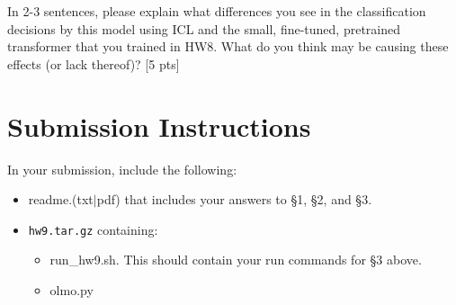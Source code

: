\documentclass[11pt]{article}
\begin{document}
\vspace{2em}
 In 2-3 sentences, please explain what differences you see in the classification decisions by this model using ICL and the small, fine-tuned, pretrained transformer that you trained in HW8. What do you think may be causing these effects (or lack thereof)? \hfill [5 pts]



\section*{Submission Instructions}

In your submission, include the following:
\begin{itemize}
  \item readme.(txt$\mid$pdf) that includes your answers to \S1, \S2, and \S3. 
  \item \texttt{hw9.tar.gz} containing:
  \begin{itemize}
    \item run\_hw9.sh.  This should contain your run commands for \S3 above. 
    \item olmo.py
  \end{itemize}
\end{itemize}
\end{document}
